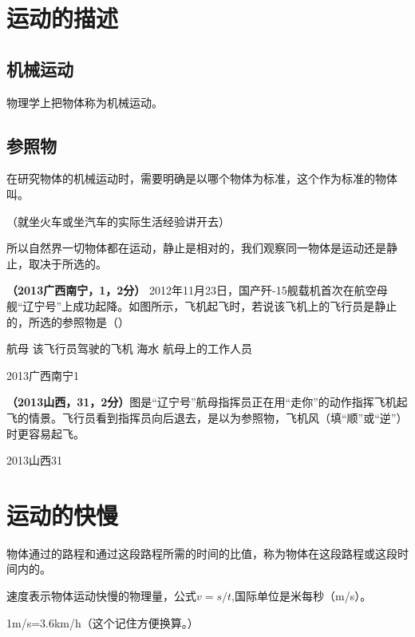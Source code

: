\documentclass[12pt,twoside]{exam}
\begin{document}
\begin{knowledge}
\section{运动的描述}
\subsection{机械运动}
物理学上把物体称为机械运动。


\subsection{参照物}
在研究物体的机械运动时，需要明确是以哪个物体为标准，这个作为标准的物体叫\answerline*[参照物]。

（就坐火车或坐汽车的实际生活经验讲开去）

所以自然界一切物体都在运动，静止是相对的，我们观察同一物体是运动还是静止，取决于所选的\answerline*[参照物]。


\textbf{（2013广西南宁，1，2分） } 2012年11月23日，国产歼-15舰载机首次在航空母舰“辽宁号”上成功起降。如图所示，飞机起飞时，若说该飞机上的飞行员是静止的，所选的参照物是（\answerline*[B]）

\begin{oneparchoices}
\choice 航母 
\choice 该飞行员驾驶的飞机
\choice 海水
\choice 航母上的工作人员
\end{oneparchoices}

\begin{linefig}[0.8]{2013广西南宁1}
\end{linefig}
\begin{multicols}{2}


\textbf{（2013山西，31，2分）}图是“辽宁号”航母指挥员正在用“走你”的动作指挥飞机起飞的情景。飞行员看到指挥员向后退去，是以\answerline*[飞机]为参照物，飞机\answerline*[逆]风（填“顺”或“逆”）时更容易起飞。
\columnbreak
\begin{linefig}{2013山西31}
\end{linefig}
\end{multicols}


\section{运动的快慢}
物体通过的路程和通过这段路程所需的时间的比值，称为物体在这段路程或这段时间内的\answerline*[速度]。

速度表示物体运动快慢的物理量，公式$v=s/t$,国际单位是米每秒（m/s）。

1m/s=3.6km/h（这个记住方便换算。）



\end{knowledge}
\end{document}

